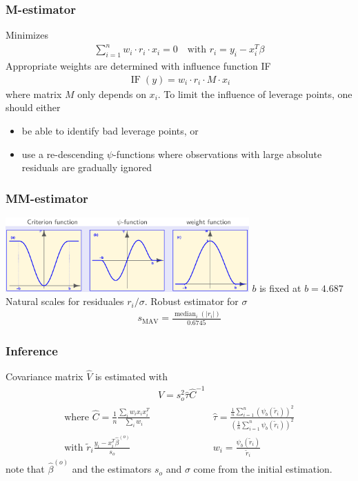 \subsubsection{M-estimator}
Minimizes
\begin{align*}
\sum_{i=1}^n w_i \cdot r_i \cdot x_i
=
0
\quad
\text{with }
r_i
=
y_i - x_i^T \beta
\end{align*}
Appropriate weights are determined with influence function IF
\begin{align*}
\operatorname{IF}(y)
=
w_i \cdot r_i \cdot M \cdot x_i
\end{align*}
where matrix $M$ only depends on $x_i$.
To limit the influence of leverage points,
one should either
\begin{itemize}
\item be able to identify bad leverage points, or
\item use a re-descending $\psi$-functions
where observations with large absolute residuals are gradually ignored
\end{itemize}

\subsubsection{MM-estimator}
\includegraphics[width=0.7\textwidth]{
sections/MultipleLinearRegression/images/psi-function}
$b$ is fixed at $b=4.687$
\glqq Natural\grqq{} scales for residuales $r_i/\sigma$.
Robust estimator for $\sigma$
\begin{align*}
s_\text{MAV}
=
\frac{\operatorname{median}_i(|r_i|)}{0.6745}
\end{align*}

\subsubsection{Inference}
Covariance matrix $\widehat{V}$ is estimated with
\begin{align*}
 & \widehat{V}
=
s_o^2 \widehat{\tau} \widehat{C}^{-1}
\\
\text{where }
\widehat{C}
=
\frac{1}{n} \frac{\sum_i w_i x_i x_i^T}{\sum_i w_i}
 &             &
\widehat{\tau}
=
\frac{
\frac{1}{n} \sum_{i=1}^n \left( \psi_b \left(\widetilde{r}_i\right)\right)^2
}{
\left(\frac{1}{n} \sum_{i=1}^n \psi_b \left(\widetilde{r}_i\right)\right)^2
}
\\
\text{with }
\widetilde{r}_i
\frac{y_i - x_i^T \widehat{\beta}^{(o)}}{s_o}
 &             &
w_i = \frac{\psi_b(\widetilde{r}_i)}{\widetilde{r}_i}
\end{align*}
note that $\widehat{\beta}^{(o)}$ and
the estimators $s_o$ and $\sigma$ come from the initial estimation.